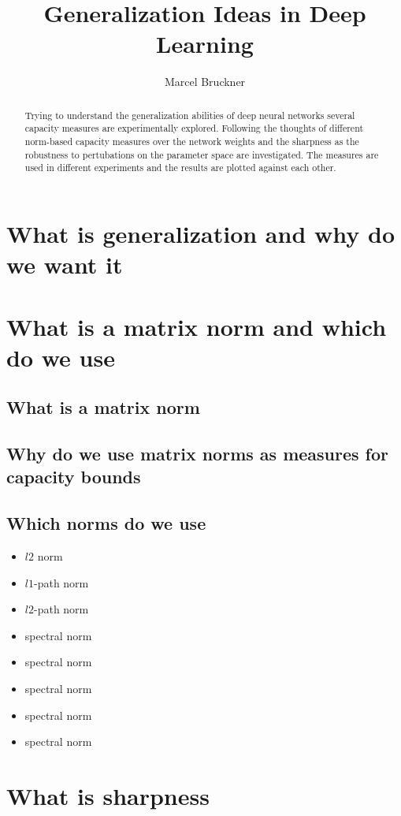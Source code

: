 \documentclass[a4paper,10pt]{article}
\title{Generalization Ideas in Deep Learning} %
\author{Marcel Bruckner} %
\institute{\textit{Seminar: Optimization and Generalization in Deep Learning}}
\begin{document}
\maketitle

\begin{abstract}
Trying to understand the generalization abilities of deep neural networks several capacity measures are experimentally explored. Following the thoughts of \cite{neyshabur2017exploring} different norm-based capacity measures over the network weights and the sharpness as the robustness to pertubations on the parameter space are investigated. The measures are used in different experiments and the results are plotted against each other.
\end{abstract}

\section{What is generalization and why do we want it}

\section{What is a matrix norm and which do we use}
\subsection{What is a matrix norm}
\subsection{Why do we use matrix norms as measures for capacity bounds}
\subsection{Which norms do we use}
\begin{itemize}
    \item $l2$ norm
    \item $l1$-path norm
    \item $l2$-path norm
    \item spectral norm
    \item spectral norm
    \item spectral norm
    \item spectral norm
    \item spectral norm
\end{itemize}

\section{What is sharpness}
\newpage
\end{document}
